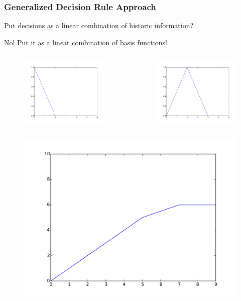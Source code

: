 \documentclass{beamer}
\begin{document}
\begin{frame}
\frametitle{Generalized Decision Rule Approach}
Put decisions as a linear combination of historic information?

No! Put it as a linear combination of basis functions!
\begin{columns}
\begin{figure}
\flushright
\includegraphics[width=.7\textwidth]{basis_1.pdf}
\end{figure}
\begin{figure}
\flushleft
\includegraphics[width=.7\textwidth]{basis_2.pdf}
\end{figure}
\end{columns}
\begin{figure}
\centering
\includegraphics[width=.5\textwidth]{plf_2.pdf}
\end{figure}
\end{frame}
\end{document}

